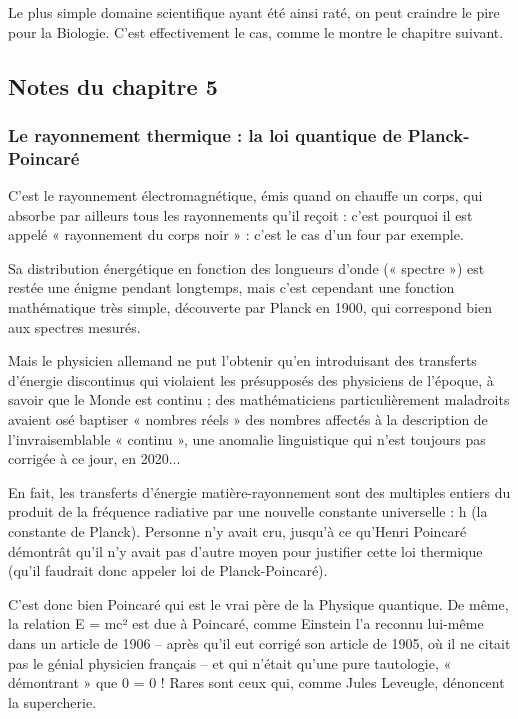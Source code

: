 \documentclass[a4paper,12pt]{article}
\begin{document}
Le plus simple domaine scientifique ayant été ainsi raté, on peut craindre le pire pour la Biologie. C’est effectivement le cas, comme le montre le chapitre suivant.

\subsection{Notes du chapitre 5}

\subsubsection {Le rayonnement thermique : la loi quantique de Planck-Poincaré}

C'est le rayonnement électromagnétique, émis quand on chauffe un corps, qui absorbe par ailleurs tous les rayonnements qu'il reçoit : c'est pourquoi il est appelé « rayonnement du corps noir » : c'est le cas d'un four par exemple.


Sa distribution énergétique en fonction des longueurs d'onde (« spectre ») est restée une énigme pendant longtemps, mais c'est cependant une fonction mathématique très simple, découverte par Planck en 1900, qui correspond bien aux spectres mesurés.


Mais le physicien allemand ne put l'obtenir qu'en introduisant des transferts d'énergie discontinus qui violaient les présupposés des physiciens de l'époque, à savoir que le Monde est continu ; des mathématiciens particulièrement maladroits avaient osé baptiser « nombres réels » des nombres affectés à la description de l'invraisemblable « continu », une anomalie linguistique qui n'est toujours pas corrigée à ce jour, en 2020... 


En fait, les transferts d'énergie matière-rayonnement sont des multiples entiers du produit de la fréquence radiative par une nouvelle constante universelle : h (la constante de Planck). Personne n'y avait cru, jusqu'à ce qu'Henri Poincaré démontrât qu'il n'y avait pas d'autre moyen pour justifier cette loi thermique (qu'il faudrait donc appeler loi de Planck-Poincaré). 


C'est donc bien Poincaré qui est le vrai père de la Physique quantique. De même, la relation E = mc² est due à Poincaré, comme Einstein l'a reconnu lui-même dans un article de 1906 – après qu'il eut corrigé son article de 1905, où il ne citait pas le génial physicien français – et qui n'était qu'une pure tautologie, « démontrant » que 0 = 0 ! Rares sont ceux qui, comme Jules Leveugle, dénoncent la supercherie.
\end{document}
